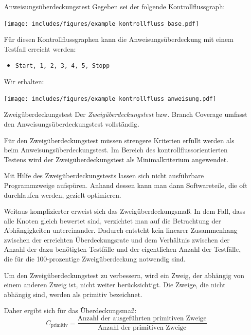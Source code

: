 \begin{example}{Anweisungsüberdeckungstest}
    Gegeben sei der folgende Kontrollflussgraph:
    \begin{center}
        \texttt{[image: includes/figures/example\_kontrollfluss\_base.pdf]}
    \end{center}

    Für diesen Kontrollflussgraphen kann die Anweisungsüberdeckung mit einem Testfall erreicht werden:
    \begin{itemize}
        \item \texttt{Start, 1, 2, 3, 4, 5, Stopp}
    \end{itemize}

    Wir erhalten:
    \begin{center}
        \texttt{[image: includes/figures/example\_kontrollfluss\_anweisung.pdf]}
    \end{center}
\end{example}

\begin{defi}{Zweigüberdeckungstest}
    Der \emph{Zweigüberdeckungstest} bzw. Branch Coverage umfasst den Anweisungsüberdeckungstest vollständig.

    Für den Zweigüberdeckungstest  müssen strengere Kriterien erfüllt werden als beim Anweisungsüberdeckungstest.
    Im Bereich des kontrollflussorientierten Testens wird der Zweigüberdeckungstest als Minimalkriterium angewendet.

    Mit Hilfe des Zweigüberdeckungstests lassen sich nicht ausführbare Programmzweige aufspüren.
    Anhand dessen kann man dann Softwareteile, die oft durchlaufen werden, gezielt optimieren.

    Weitaus komplizierter erweist sich das Zweigüberdeckungsmaß.
    In dem Fall, dass alle Knoten gleich bewertet sind, verzichtet man auf die Betrachtung der Abhängigkeiten untereinander.
    Dadurch entsteht kein linearer Zusammenhang zwischen der erreichten Überdeckungsrate und dem Verhältnis zwischen der Anzahl der dazu benötigten Testfälle und der eigentlichen Anzahl der Testfälle, die für die 100-prozentige Zweigüberdeckung notwendig sind.

    Um den Zweigüberdeckungstest zu verbessern, wird ein Zweig, der abhängig von einem anderen Zweig ist, nicht weiter berücksichtigt.
    Die Zweige, die nicht abhängig sind, werden als primitiv bezeichnet.

    Daher ergibt sich für das Überdeckungsmaß:
    \[
        C_{\text{primitiv}} = \frac{\text{Anzahl der ausgeführten primitiven Zweige}}{\text{Anzahl der primitiven Zweige}}
    \]
\end{defi}

